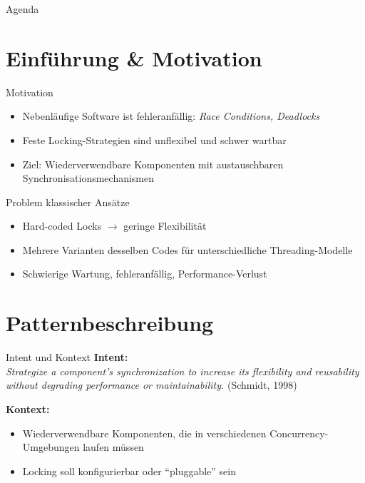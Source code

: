\documentclass[aspectratio=169,10pt]{beamer}
\subtitle{Presentation subtitle or context (e.g. course, event)}
\author[Author Name]{Author Name}
\institute[]{Institute / Affiliation}
\date{\today} %
\begin{document}
\begin{frame}
  \titlepage
\end{frame}

\begin{frame}{Agenda}
  \tableofcontents[hideallsubsections]
\end{frame}

\section{Einf\"uhrung \& Motivation}
\begin{frame}{Motivation}
  \begin{itemize}
    \item Nebenl\"aufige Software ist fehleranf\"allig: \textit{Race Conditions, Deadlocks}
    \item Feste Locking-Strategien sind unflexibel und schwer wartbar
    \item Ziel: Wiederverwendbare Komponenten mit austauschbaren Synchronisationsmechanismen
  \end{itemize}
\end{frame}

\begin{frame}{Problem klassischer Ans\"atze}
  \begin{itemize}
    \item Hard-coded Locks $\rightarrow$ geringe Flexibilit\"at
    \item Mehrere Varianten desselben Codes f\"ur unterschiedliche Threading-Modelle
    \item Schwierige Wartung, fehleranf\"allig, Performance-Verlust
  \end{itemize}
\end{frame}

\section{Patternbeschreibung}
\begin{frame}{Intent und Kontext}
  \textbf{Intent:}\\
  \textit{Strategize a component's synchronization to increase its flexibility and reusability without degrading performance or maintainability.} (Schmidt, 1998)

  \vspace{1em}
  \textbf{Kontext:}
  \begin{itemize}
    \item Wiederverwendbare Komponenten, die in verschiedenen Concurrency-Umgebungen laufen m\"ussen
    \item Locking soll konfigurierbar oder \enquote{pluggable} sein
  \end{itemize}
\end{frame}
\end{document}
